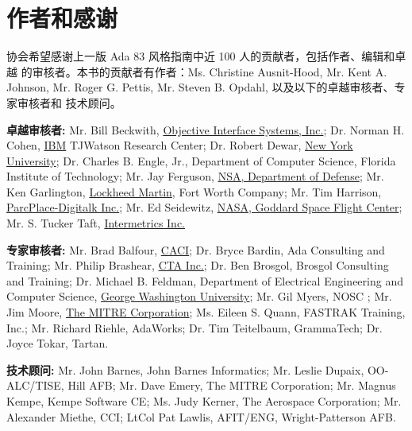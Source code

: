 %
%
%

\chapter{作者和感谢}
\pagestyle{empty}

协会希望感谢上一版 Ada 83 风格指南中近 100 人的贡献者，包括作者、编辑和卓越
的审核者。本书的贡献者有作者：Ms. Christine Ausnit-Hood, Mr. Kent A. Johnson,
Mr. Roger G. Pettis, Mr. Steven B. Opdahl, 以及以下的卓越审核者、专家审核者和
技术顾问。

\textbf{卓越审核者:} Mr. Bill Beckwith,
\href{http://www.ois.com}{Objective Interface Systems, Inc.};
Dr. Norman H. Cohen, \href{http://www.ibm.comk}{IBM}
TJWatson Research Center; Dr. Robert Dewar,
\href{http://www.nyu.edu}{New York University};
Dr. Charles B. Engle, Jr., Department of Computer Science,
Florida Institute of Technology;
Mr. Jay Ferguson, \href{http://http://www.fas.org/irp/nsa/index.html}{NSA, Department of Defense};
Mr. Ken Garlington, \href{http://www.lmco.com/}{Lockheed Martin},
Fort Worth Company;
Mr. Tim Harrison, \href{http://www.parcplace.com/}{ParcPlace-Digitalk Inc.};
Mr. Ed Seidewitz, \href{http://www.gsfc.nasa.gov/}
{NASA, Goddard Space Flight Center};
Mr. S. Tucker Taft, \href{http://www.intermetrics.com/}{Intermetrics Inc.}

\textbf{专家审核者:} Mr. Brad Balfour, \href{http://www.caci.com/}{CACI};
Dr. Bryce Bardin, Ada Consulting and Training;
Mr. Philip Brashear, \href{http://www.cta.com/}{CTA Inc.}; Dr. Ben Brosgol,
Brosgol Consulting and Training; Dr. Michael B. Feldman,
Department of Electrical Engineering and Computer Science,
\href{http://www.gwu.edu/}{George Washington University};
Mr. Gil Myers, NOSC ;
Mr. Jim Moore, \href{http://www.mitre.org/}{The MITRE Corporation};
Ms. Eileen S. Quann, FASTRAK Training, Inc.;
Mr. Richard Riehle, AdaWorks;
Dr. Tim Teitelbaum, GrammaTech; Dr. Joyce Tokar, Tartan.

\textbf{技术顾问:} Mr. John Barnes, John Barnes Informatics; Mr. Leslie Dupaix,
OO-ALC/TISE, Hill AFB; Mr. Dave Emery, The MITRE Corporation; Mr. Magnus Kempe,
Kempe Software CE; Ms. Judy Kerner, The Aerospace Corporation; Mr. Alexander
Miethe, CCI; LtCol Pat Lawlis, AFIT/ENG, Wright-Patterson AFB.


